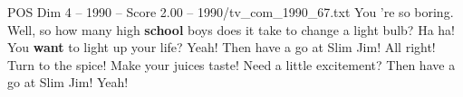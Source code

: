 \begin{textsample}{POS Dim 4 – 1990 – Score 2.00 – 1990/tv\_com\_1990\_67.txt}  \label{ex:f4_pos_022}
You 're so boring.
Well, so how many high \textbf{school} boys does it take to change a light bulb?
Ha ha!
You \textbf{want} to light up your life?
Yeah!
Then have a go at Slim Jim!
All right!
Turn to the spice!
Make your juices taste!
Need a little excitement?
Then have a go at Slim Jim!
Yeah!

\end{textsample}
